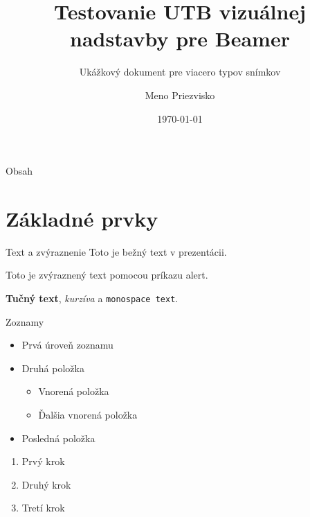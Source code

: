 \documentclass[aspectratio=169]{beamer}
\title[UTB Beamer test]{Testovanie UTB vizuálnej nadstavby pre Beamer}
\subtitle{Ukážkový dokument pre viacero typov snímkov}
\author[Meno Priezvisko]{Meno Priezvisko}
\institute{Univerzita Tomáše Bati ve Zlíně}
\date{\today}
\begin{document}
	
	\begin{frame}
		\titlepage
	\end{frame}
	
	\begin{frame}{Obsah}
		\tableofcontents
	\end{frame}
	
	\section{Základné prvky}
	
	\begin{frame}{Text a zvýraznenie}
		Toto je bežný text v prezentácii.
		
		\vspace{0.4cm}
		
		Toto je \alert{zvýraznený text pomocou príkazu alert}.
		
		\vspace{0.4cm}
		
		\textbf{Tučný text}, \textit{kurzíva} a \texttt{monospace text}.
	\end{frame}
	
	\begin{frame}{Zoznamy}
		\begin{itemize}
			\item Prvá úroveň zoznamu
			\item Druhá položka
			\begin{itemize}
				\item Vnorená položka
				\item Ďalšia vnorená položka
			\end{itemize}
			\item Posledná položka
		\end{itemize}
		
		\vspace{0.4cm}
		
		\begin{enumerate}
			\item Prvý krok
			\item Druhý krok
			\item Tretí krok
		\end{enumerate}
	\end{frame}
	
\end{document}
